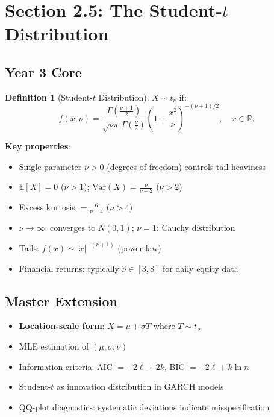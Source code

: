 \documentclass[11pt, a4paper]{article}
\newcommand{\E}{\mathbb{E}}
\newcommand{\Var}{\text{Var}}
\newcommand{\R}{\mathbb{R}}
\theoremstyle{definition}
\newtheorem{defn}{Definition}
\begin{document}
\section{Section 2.5: The Student-$t$ Distribution}

\subsection{Year 3 Core}

\begin{defn}[Student-$t$ Distribution]
$X \sim t_\nu$ if:
\[
  f(x;\nu) = \frac{\Gamma\!\left(\frac{\nu+1}{2}\right)}{\sqrt{\nu\pi}\,\Gamma\!\left(\frac{\nu}{2}\right)} \left(1 + \frac{x^2}{\nu}\right)^{-(\nu+1)/2}, \quad x \in \R.
\]
\end{defn}

\noindent\textbf{Key properties}:
\begin{itemize}
  \item Single parameter $\nu > 0$ (degrees of freedom) controls tail heaviness
  \item $\E[X] = 0$ ($\nu > 1$); \quad $\Var(X) = \frac{\nu}{\nu-2}$ ($\nu > 2$)
  \item Excess kurtosis $= \frac{6}{\nu - 4}$ ($\nu > 4$)
  \item $\nu \to \infty$: converges to $N(0,1)$; \quad $\nu = 1$: Cauchy distribution
  \item Tails: $f(x) \sim |x|^{-(\nu+1)}$ (power law)
  \item Financial returns: typically $\hat{\nu} \in [3, 8]$ for daily equity data
\end{itemize}

\subsection{Master Extension}
\begin{itemize}
  \item \textbf{Location-scale form}: $X = \mu + \sigma T$ where $T \sim t_\nu$
  \item MLE estimation of $(\mu, \sigma, \nu)$
  \item Information criteria: AIC $= -2\ell + 2k$, BIC $= -2\ell + k\ln n$
  \item Student-$t$ as innovation distribution in GARCH models
  \item QQ-plot diagnostics: systematic deviations indicate misspecification
\end{itemize}
\end{document}
